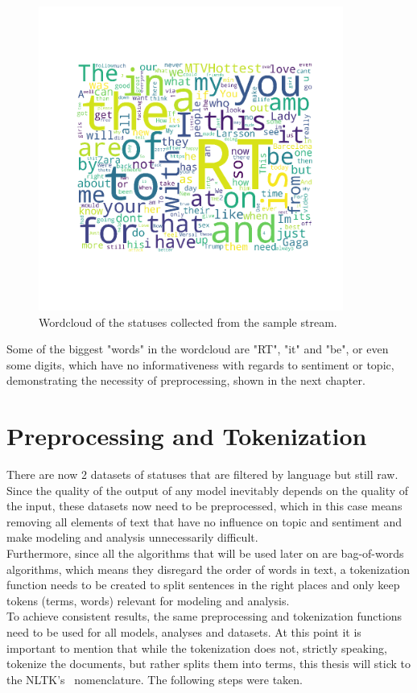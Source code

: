 \begin{figure}
    \centering
    \caption{Wordcloud of the statuses collected from the sample stream.}
    \label{fig:wordloud_pre}
    \includegraphics[width=10cm]{../images/wordcloud_pre.png}
\end{figure}

Some of the biggest "words" in the wordcloud are "RT", "it" and "be",
or even some digits, which have no informativeness with regards to sentiment or topic,
demonstrating the necessity of preprocessing, shown in the next chapter.


\section{Preprocessing and Tokenization}
\label{sec:preprocessingAndTokenization}

There are now 2 datasets of statuses that are filtered by language but still raw.
Since the quality of the output of any model inevitably depends on the quality of the input,
these datasets now need to be preprocessed,
which in this case means removing all elements of text that have no influence on topic and sentiment and make
modeling and analysis unnecessarily difficult.\\
Furthermore, since all the algorithms that will be used later on are bag-of-words algorithms,
which means they disregard the order of words in text, a tokenization function needs to be created
to split sentences in the right places and only keep tokens (terms, words) relevant for modeling and analysis.\\
To achieve consistent results, the same preprocessing and tokenization functions need to be used for all models, analyses and datasets.
At this point it is important to mention that while the tokenization does not, strictly speaking, tokenize the documents,
but rather splits them into terms, this thesis will stick to the NLTK's~\cite{nltkDocs} nomenclature.
The following steps were taken.

